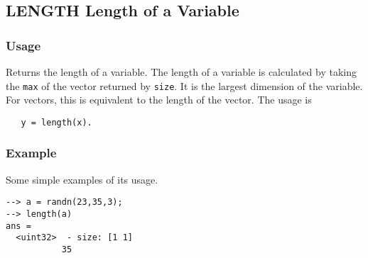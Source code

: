 %
%
%
\subsection{LENGTH Length of a Variable}
\subsubsection{Usage}
Returns the length of a variable.  The length of a variable is calculated
by taking the \verb|max| of the vector returned by \verb|size|.  It is
the largest dimension of the variable.  For vectors, this is equivalent
to the length of the vector.  The usage is
\begin{verbatim}
   y = length(x).
\end{verbatim}
\subsubsection{Example}
Some simple examples of its usage.
\begin{verbatim}
--> a = randn(23,35,3);
--> length(a)
ans =
  <uint32>  - size: [1 1]
           35
\end{verbatim}
